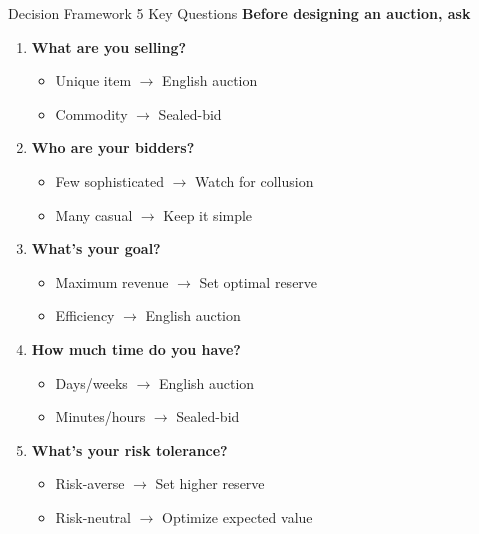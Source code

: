 \documentclass[xcolor={x11names}]{beamer}
\begin{document}
\begin{frame}{Decision Framework 5 Key Questions}
\textbf{Before designing an auction, ask}
\begin{enumerate}
  \item \textbf{What are you selling?}
  \begin{itemize}
    \item Unique item $\rightarrow$ English auction
    \item Commodity $\rightarrow$ Sealed-bid
  \end{itemize}
  
  \item \textbf{Who are your bidders?}
  \begin{itemize}
    \item Few sophisticated $\rightarrow$ Watch for collusion
    \item Many casual $\rightarrow$ Keep it simple
  \end{itemize}
  
  \item \textbf{What's your goal?}
  \begin{itemize}
    \item Maximum revenue $\rightarrow$ Set optimal reserve
    \item Efficiency $\rightarrow$ English auction
  \end{itemize}
  
  \item \textbf{How much time do you have?}
  \begin{itemize}
    \item Days/weeks $\rightarrow$ English auction
    \item Minutes/hours $\rightarrow$ Sealed-bid
  \end{itemize}
  
  \item \textbf{What's your risk tolerance?}
  \begin{itemize}
    \item Risk-averse $\rightarrow$ Set higher reserve
    \item Risk-neutral $\rightarrow$ Optimize expected value
  \end{itemize}
\end{enumerate}
\end{frame}
\end{document}
